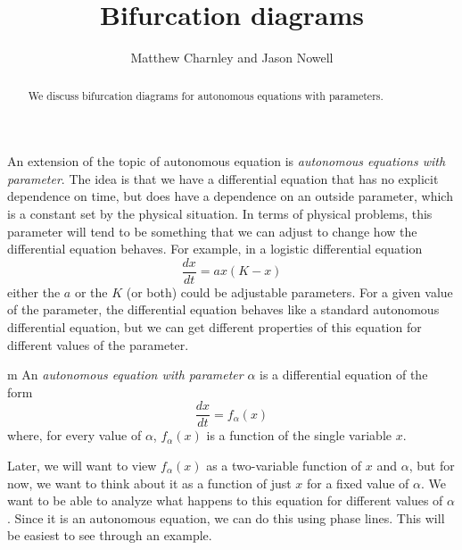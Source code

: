 \documentclass{ximera}
\title{Bifurcation diagrams}
\author{Matthew Charnley and Jason Nowell}
\begin{document}
\begin{abstract}
    We discuss bifurcation diagrams for autonomous equations with parameters.
\end{abstract}
\maketitle

\label{bifDiag:section}

An extension of the topic of autonomous equation is \emph{autonomous equations with parameter}. The idea is that we have a differential equation that has no explicit dependence on time, but does have a dependence on an outside parameter, which is a constant set by the physical situation. In terms of physical problems, this parameter will tend to be something that we can adjust to change how the differential equation behaves. For example, in a logistic differential equation 
\begin{equation*}
    \frac{dx}{dt} = ax(K-x)
\end{equation*}
either the $a$ or the $K$ (or both) could be adjustable parameters. For a given value of the parameter, the differential equation behaves like a standard autonomous differential equation, but we can get different properties of this equation for different values of the parameter. 

\begin{definition}m
    An \emph{autonomous equation with parameter} $\alpha$ is a differential equation of the form 
    \begin{equation*}
        \frac{dx}{dt} = f_\alpha(x)
    \end{equation*}
    where, for every value of $\alpha$, $f_\alpha(x)$ is a function of the single variable $x$. 
\end{definition}

Later, we will want to view $f_\alpha(x)$ as a two-variable function of $x$ and $\alpha$, but for now, we want to think about it as a function of just $x$ for a fixed value of $\alpha$. We want to be able to analyze what happens to this equation for different values of $\alpha$. Since it is an autonomous equation, we can do this using phase lines. This will be easiest to see through an example.
\end{document}
